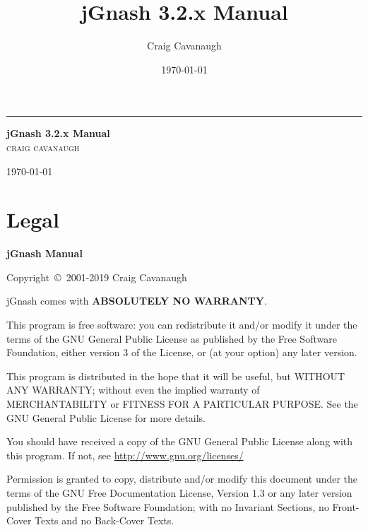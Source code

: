 \documentclass[letterpaper,12pt]{book}
\title{\textbf{jGnash 3.2.x Manual} }
\author{Craig Cavanaugh}
\date{\today}
\begin{document}
    \begin{titlepage}

        \raggedleft %

        \rule{2pt}{\textheight} %
        \hspace{0.08\textwidth} %
        \parbox[b]{0.75\textwidth}{ %

        {\Huge\bfseries jGnash 3.2.x Manual}\\[2\baselineskip] %
        {\Large\textsc{craig cavanaugh}}

        \vspace{0.5\textheight} %

        {\noindent \today}\\[\baselineskip] %
        }

    \end{titlepage}

    \tableofcontents
    \mainmatter

    \chapter{Legal}\label{ch:legal}
    {\bfseries jGnash Manual}

    Copyright~\copyright~2001-2019 Craig Cavanaugh

    jGnash comes with \textbf{ABSOLUTELY NO WARRANTY}.

    This program is free software: you can redistribute it and/or modify it under the terms of the GNU General Public
    License as published by the Free Software Foundation, either version 3 of the License, or (at your option) any later version.

    This program is distributed in the hope that it will be useful, but WITHOUT ANY WARRANTY; without even the implied
    warranty of MERCHANTABILITY or FITNESS FOR A PARTICULAR PURPOSE. See the GNU General Public License for more details.

    You should have received a copy of the GNU General Public License along with this program.
    If not, see \href{http://www.gnu.org/licenses/}{http://www.gnu.org/licenses/}

    Permission is granted to copy, distribute and/or modify this document under the terms of the GNU Free Documentation
    License, Version 1.3 or any later version published by the Free Software Foundation; with no Invariant Sections,
    no Front-Cover Texts and no Back-Cover Texts.
\end{document}
